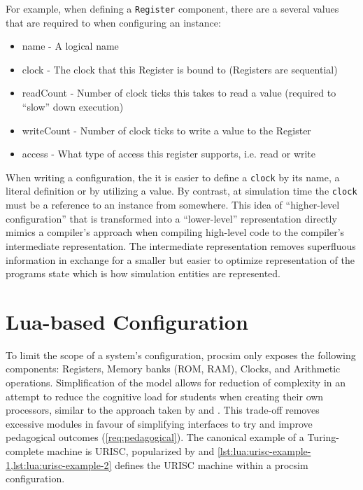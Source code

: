 For example, when defining a \texttt{Register} component, there are a several values that are required to when configuring an instance: 
\begin{itemize}
\item name - A logical name
\item clock - The clock that this Register is bound to (Registers are sequential)
\item readCount - Number of clock ticks this takes to read a value (required to ``slow'' down execution)
\item writeCount - Number of clock ticks to write a value to the Register
\item access - What type of access this register supports, i.e. read or write
\end{itemize}
When writing a configuration, the it is easier to define a \texttt{clock} by its name, a literal definition or by utilizing a  value. By contrast, at simulation time the \texttt{clock} must be a reference to an instance from somewhere. This idea of ``higher-level configuration'' that is transformed into a ``lower-level'' representation directly mimics a compiler's approach when compiling high-level code to the compiler's intermediate representation. The intermediate representation removes superfluous information in exchange for a smaller but easier to optimize representation of the programs state which is how simulation entities are represented.



\section{Lua-based Configuration}

To limit the scope of a system's configuration, procsim only exposes the following components: Registers, Memory banks (ROM, RAM), Clocks, and Arithmetic operations. Simplification of the model allows for reduction of complexity in an attempt to reduce the cognitive load for students when creating their own processors, similar to the approach taken by \cite{Skrien2001} and \cite{Garcia2009}. This trade-off removes excessive modules in favour of simplifying interfaces to try and improve pedagogical outcomes (\cref{req:pedagogical}). The canonical example of a Turing-complete machine is URISC, popularized by \cite{Mavaddat1988} and \cref{lst:lua:urisc-example-1,lst:lua:urisc-example-2} defines the URISC machine within a procsim configuration.

